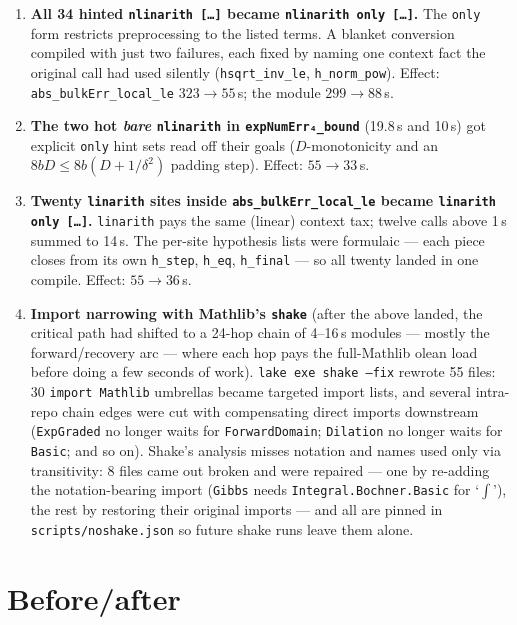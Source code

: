\documentclass[11pt]{article}
\begin{document}
\begin{enumerate}[leftmargin=2em]
\item \textbf{All 34 hinted \texttt{nlinarith [\dots]} became
\texttt{nlinarith only [\dots]}.} The \texttt{only} form restricts
preprocessing to the listed terms. A blanket conversion compiled with
just two failures, each fixed by naming one context fact the original
call had used silently (\texttt{hsqrt\_inv\_le},
\texttt{h\_norm\_pow}). Effect: \texttt{abs\_bulkErr\_local\_le}
$323 \to 55$\,s; the module $299 \to 88$\,s.
\item \textbf{The two hot \emph{bare} \texttt{nlinarith} in
\texttt{expNumErr₄\_bound}} (19.8\,s and 10\,s) got explicit
\texttt{only} hint sets read off their goals ($D$-monotonicity and an
$8bD \le 8b(D + 1/\delta^2)$ padding step). Effect: $55 \to 33$\,s.
\item \textbf{Twenty \texttt{linarith} sites inside
\texttt{abs\_bulkErr\_local\_le} became \texttt{linarith only
[\dots]}.} \texttt{linarith} pays the same (linear) context tax; twelve
calls above 1\,s summed to 14\,s. The per-site hypothesis lists were
formulaic --- each piece closes from its own \texttt{h\_step},
\texttt{h\_eq}, \texttt{h\_final} --- so all twenty landed in one
compile. Effect: $55 \to 36$\,s.
\item \textbf{Import narrowing with Mathlib's \texttt{shake}} (after
the above landed, the critical path had shifted to a 24-hop chain of
4--16\,s modules --- mostly the forward/recovery arc --- where each hop
pays the full-Mathlib olean load before doing a few seconds of work).
\texttt{lake exe shake --fix} rewrote 55 files: 30 \texttt{import
Mathlib} umbrellas became targeted import lists, and several intra-repo
chain edges were cut with compensating direct imports downstream
(\texttt{ExpGraded} no longer waits for \texttt{ForwardDomain};
\texttt{Dilation} no longer waits for \texttt{Basic}; and so on).
Shake's analysis misses notation and names used only via transitivity:
8 files came out broken and were repaired --- one by re-adding the
notation-bearing import (\texttt{Gibbs} needs
\texttt{Integral.Bochner.Basic} for `$\int$'), the rest by restoring
their original imports --- and all are pinned in
\texttt{scripts/noshake.json} so future shake runs leave them alone.
\end{enumerate}

\section{Before/after}
\end{document}
